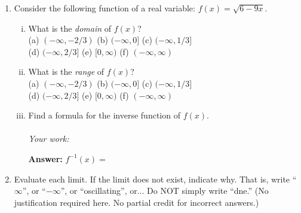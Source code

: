 \documentclass[fleqn,12pt]{article}
\newcommand{\<}{\ensuremath{\langle}}
\renewcommand{\>}{\ensuremath{\rangle}}
\begin{document}
    \begin{enumerate}
    \item
      Consider the following function of a real variable: $f(x) = \sqrt{6 - 9x}$.

      \begin{enumerate}[i.]
      \item 
        What is the \emph{domain} of $f(x)$?
        \\[4pt]
        (a) $(-\infty, -2/3)$ \hfill 
        (b) $(-\infty, 0]$ \hfill
          (c) $(-\infty, 1/3]$ \hfill\\[5pt]
            (d) $(-\infty, 2/3]$ \hfill
              (e) $[0, \infty)$ \hfill
                (f) $(-\infty, \infty)$

                \bigskip
                \bigskip

              \item
                What is the \emph{range} of $f(x)$?
                \\[4pt]
                (a) $(-\infty, -2/3)$ \hfill (b) $(-\infty, 0]$ \hfill
              (c) $(-\infty, 1/3]$ \hfill\\[5pt]
                (d) $(-\infty, 2/3]$ \hfill
                  (e) $[0, \infty)$ \hfill
                    (f) $(-\infty, \infty)$

                    \bigskip
                    \bigskip


                  \item
                    Find a formula for the inverse function of $f(x)$.
                    \\\\
                        {\it Your work:}

                        \vskip10cm

                        \hfill {\bf Answer:} \phantom{X} $f^{-1}(x) =$ \phantom{XXXXXXXXXXXXXXX}\\
                        \phantom{X}  \hfill \underline{\phantom{XXXXXXXXXXXXXX}}

      \end{enumerate}

    \newpage

    \item Evaluate each limit. If the limit does not exist, indicate why.
      That is, write ``$\infty$'', or ``$-\infty$'', or ``oscillating'', or...  Do NOT simply write ``dne.''
      (No justification required here. No partial credit for incorrect answers.)
      \begin{enumerate}[{\it i.}]


\end{enumerate}
\end{enumerate}
\end{document}

